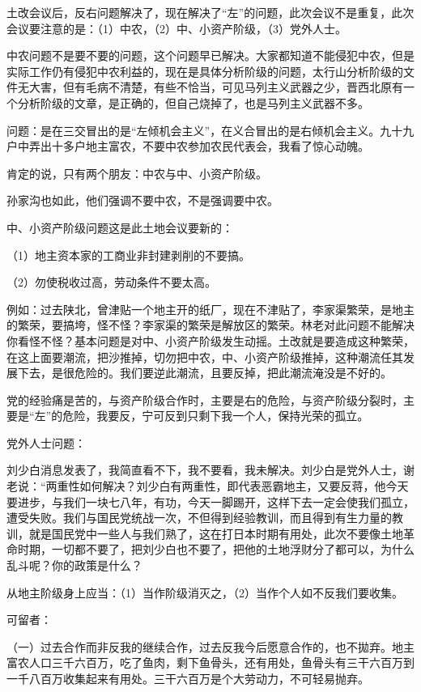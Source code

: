 土改会议后，反右问题解决了，现在解决了“左”的问题，此次会议不是重复，此次会议要注意的是：（1）中农，（2）中、小资产阶级，（3）党外人士。

中农问题不是要不要的问题，这个问题早已解决。大家都知道不能侵犯中农，但是实际工作仍有侵犯中农利益的，现在是具体分析阶级的问题，太行山分析阶级的文件无大害，但有毛病不清楚，有些不恰当，可见马列主义武器之少，晋西北原有一个分析阶级的文章，是正确的，但自己烧掉了，也是马列主义武器不多。

问题：是在三交冒出的是“左倾机会主义”，在义合冒出的是右倾机会主义。九十九户中弄出十多户地主富农，不要中农参加农民代表会，我看了惊心动魄。

肯定的说，只有两个朋友：中农与中、小资产阶级。

孙家沟也如此，他们强调不要中农，不是强调要中农。

中、小资产阶级问题这是此土地会议要新的：

（1）地主资本家的工商业非封建剥削的不要搞。

（2）勿使税收过高，劳动条件不要太高。

例如：过去陕北，曾津贴一个地主开的纸厂，现在不津贴了，李家渠繁荣，是地主的繁荣，要搞垮，怪不怪？李家渠的繁荣是解放区的繁荣。林老对此问题不能解决你看怪不怪？基本问题是对中、小资产阶级发生动摇。土改就是要造成这种繁荣，在这上面要潮流，把沙推掉，切勿把中农，中、小资产阶级推掉，这种潮流任其发展下去，是很危险的。我们要逆此潮流，且要反掉，把此潮流淹没是不好的。

党的经验痛是苦的，与资产阶级合作时，主要是右的危险，与资产阶级分裂时，主要是“左”的危险，我要反，宁可反到只剩下我一个人，保持光荣的孤立。

党外人士问题：

刘少白消息发表了，我简直看不下，我不要看，我未解决。刘少白是党外人士，谢老说：“两重性如何解决？刘少白有两重性，即代表恶霸地主，又要反蒋，他今天要进步，与我们一块七八年，有功，今天一脚踢开，这样下去一定会使我们孤立，遭受失败。我们与国民党统战一次，不但得到经验教训，而且得到有生力量的教训，就是国民党中一些人与我们熟了，这在打日本时期有用处，此次不要像土地革命时期，一切都不要了，把刘少白也不要了，把他的土地浮财分了都可以，为什么乱斗呢？你的政策是什么？

从地主阶级身上应当：（1）当作阶级消灭之，（2）当作个人如不反我们要收集。

可留者：

（一）过去合作而非反我的继续合作，过去反我今后愿意合作的，也不拋弃。地主富农人口三千六百万，吃了鱼肉，剩下鱼骨头，还有用处，鱼骨头有三干六百万到一千八百万收集起来有用处。三干六百万是个大劳动力，不可轻易抛弃。

